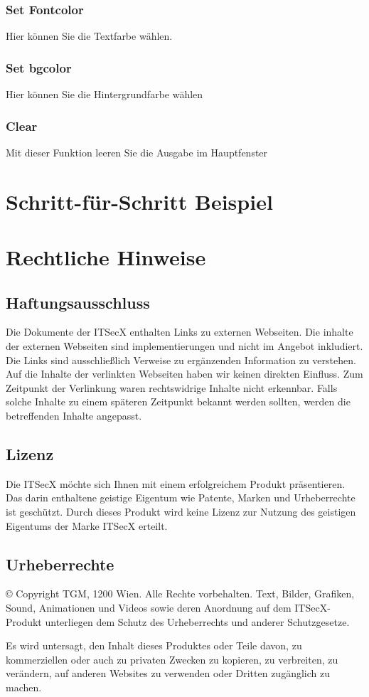 \documentclass[11pt]{article} %
\begin{document}
\subsubsection{Set Fontcolor}
Hier können Sie die Textfarbe wählen.\\
\subsubsection{Set bgcolor}
Hier können Sie die Hintergrundfarbe wählen
\subsubsection{Clear}
Mit dieser Funktion leeren Sie die Ausgabe im Hauptfenster
\section{Schritt-für-Schritt Beispiel}

\section{Rechtliche Hinweise}
\subsection{Haftungsausschluss}
Die Dokumente der ITSecX enthalten Links zu externen Webseiten. 
Die inhalte der externen Webseiten sind implementierungen und nicht
im Angebot inkludiert. 
Die Links sind ausschließlich Verweise zu ergänzenden Information
zu verstehen. 
Auf die Inhalte der verlinkten Webseiten haben wir keinen direkten
Einfluss. 
Zum Zeitpunkt der Verlinkung waren rechtswidrige 
Inhalte nicht erkennbar. 
Falls solche Inhalte zu einem späteren Zeitpunkt bekannt werden sollten,
werden die betreffenden Inhalte angepasst.

\subsection{Lizenz}
Die ITSecX möchte sich Ihnen mit einem erfolgreichem Produkt 
präsentieren. 
Das darin enthaltene geistige Eigentum wie Patente, 
Marken und Urheberrechte ist geschützt.
Durch dieses Produkt wird keine Lizenz zur Nutzung des 
geistigen Eigentums der Marke ITSecX erteilt.

\subsection{Urheberrechte}


© Copyright TGM, 1200 Wien. Alle Rechte vorbehalten. 
Text, Bilder, Grafiken, Sound, Animationen und Videos sowie deren 
Anordnung auf dem ITSecX-Produkt unterliegen dem Schutz des Urheberrechts 
und anderer Schutzgesetze.

Es wird untersagt, den Inhalt dieses Produktes oder Teile davon, 
zu kommerziellen oder auch zu privaten Zwecken zu kopieren, 
zu verbreiten, zu verändern, auf anderen Websites zu verwenden 
oder Dritten zugänglich zu machen.
\end{document}
